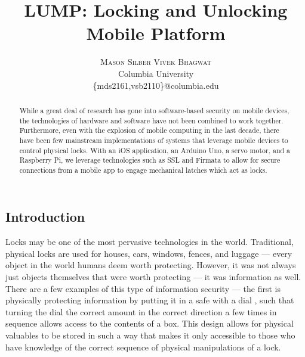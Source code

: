 \documentclass[10pt]{article}
\title{\vspace{-15mm}\fontsize{24pt}{10pt}\selectfont\textbf{LUMP: Locking and Unlocking Mobile Platform}} %
\author{
    \large
    \textsc{Mason Silber \quad Vivek Bhagwat}\\[2mm] %
    \normalsize Columbia University \\ %
    \normalsize \{mds2161,vsb2110\}@columbia.edu %
    \vspace{-5mm}
}
\date{}
\begin{document}
\maketitle %



\begin{multicols}{2} %


\begin{abstract}

While a great deal of research has gone into software-based security on mobile devices, the technologies of hardware and software have not been combined to work together. Furthermore, even with the explosion of mobile computing in the last decade, there have been few mainstream implementations of systems that leverage mobile devices to control physical locks. With an iOS application, an Arduino Uno, a servo motor, and a Raspberry Pi, we leverage technologies such as SSL and Firmata to allow for secure connections from a mobile app to engage mechanical latches which act as locks.

\end{abstract}

\section{Introduction}
Locks may be one of the most pervasive technologies in the world. Traditional, physical locks are used for houses, cars, windows, fences, and luggage --- every object in the world humans deem worth protecting. However, it was not always just objects themselves that were worth protecting --- it was information as well.\\

There are a few examples of this type of information security --- the first is physically protecting information by putting it in a safe with a dial \cite{safestructure}, such that turning the dial the correct amount in the correct direction a few times in sequence allows access to the contents of a box. This design allows for physical valuables to be stored in such a way that makes it only accessible to those who have knowledge of the correct sequence of physical manipulations of a lock. \\


\end{multicols}
\end{document}
